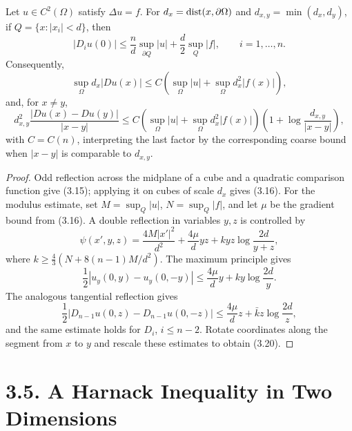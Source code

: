 \begin{theorem}\label{gt-ch3-poisson}
Let $u\in C^2(\Omega)$ satisfy $\Delta u=f$. For
$d_x=\operatorname{dist}(x,\partial\Omega)$ and $d_{x,y}=\min(d_x,d_y)$,
if $Q=\{x:|x_i|<d\}$, then
\begin{equation}
\tag{3.15}
|D_i u(0)|\leq\frac nd\sup_{\partial Q}|u|
+\frac d2\sup_Q|f|,\qquad i=1,\ldots,n.
\end{equation}
Consequently,
\begin{equation}
\tag{3.16}
\sup_\Omega d_x|Du(x)|\leq C
\left(\sup_\Omega|u|+\sup_\Omega d_x^2|f(x)|\right),
\end{equation}
and, for $x\neq y$,
\begin{equation}
\tag{3.20}
d_{x,y}^2\frac{|Du(x)-Du(y)|}{|x-y|}
\leq C\left(\sup_\Omega|u|+\sup_\Omega d_x^2|f(x)|\right)
\left(1+\log\frac{d_{x,y}}{|x-y|}\right),
\end{equation}
with $C=C(n)$, interpreting the last factor by the corresponding coarse
bound when $|x-y|$ is comparable to $d_{x,y}$.
\end{theorem}
\begin{proof}
\sketch Odd reflection across the midplane of a cube and a quadratic
comparison function give (3.15); applying it on cubes of scale $d_x$ gives
(3.16). For the modulus estimate, set $M=\sup_Q|u|$, $N=\sup_Q|f|$, and
let $\mu$ be the gradient bound from (3.16). A double reflection in variables
$y,z$ is controlled by
\begin{equation}
\tag{3.17}
\psi(x',y,z)=\frac{4M|x'|^2}{d^2}+\frac{4\mu}{d}yz
+kyz\log\frac{2d}{y+z},
\end{equation}
where $k\geq\frac43(N+8(n-1)M/d^2)$. The maximum principle gives
\begin{equation}
\tag{3.18}
\frac12|u_y(0,y)-u_y(0,-y)|
\leq\frac{4\mu}{d}y+ky\log\frac{2d}{y}.
\end{equation}
The analogous tangential reflection gives
\begin{equation}
\tag{3.19}
\frac12|D_{n-1}u(0,z)-D_{n-1}u(0,-z)|
\leq\frac{4\mu}{d}z+\bar k z\log\frac{2d}{z},
\end{equation}
and the same estimate holds for $D_i$, $i\leq n-2$. Rotate coordinates along
the segment from $x$ to $y$ and rescale these estimates to obtain (3.20).
\end{proof}

\section*{3.5. A Harnack Inequality in Two Dimensions}

